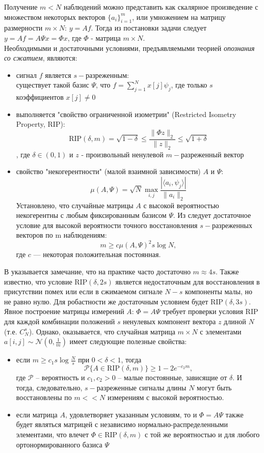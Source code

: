 \documentclass[14pt]{matmex-diploma}
\begin{document}
Получение $m < N$ наблюдений можно представить как скалярное произведение с множеством некоторых векторов $\{a_i\}_{i=1}^m$, или умножением на матрицу размерности $m\times N$: $y= A f$. Тогда из постановки задачи следует $y=A f = A \Psi x = \Phi x$, где $\Phi$ - матрица $m \times N$. \\
Необходимыми и достаточными условиями, предъявляемыми теорией \textit{опознания со сжатием}, являются: 
\begin{itemize}
\item сигнал $f$ является $s-$разреженным: \\существует такой базис $\Psi$, что $f = \sum_{j=1}^N x[j] \psi_j$, где только $s$ коэффициентов $x[j]\neq 0$
\item выполняется "свойство ограниченной изометрии" (Restricted Isometry Property, RIP):
$$\text{RIP}(\delta, m)= \sqrt{1 - \delta} \leq \frac{\| \Phi z \|_2}{\| z\|_2} \leq \sqrt{1 + \delta}$$, где $\delta \in (0,1)$ и $z$ - произвольный ненулевой $m-$разреженный вектор

\item свойство "некогерентности" (малой взаимной зависимости) $A$ и $\Psi$: 
$$\mu (A, \Psi) = \sqrt{N} \max_{i,j}\frac{|\langle a_i, \psi_j\rangle |}{\| a_i\|_2}$$
Установлено, что случайные матрицы $A$ с высокой вероятностью некогерентны с любым фиксированным базисом $\Psi$.
Из \cite{candes2007sparsity} следует достаточное условие для высокой вероятности точного восстановления $s-$разреженных векторов по m наблюдениям: 
\begin{equation}m \geq c \mu (A,\Psi)^2 s \log{N}, \end{equation}
где $c$ --- некоторая положительная постоянная.
\end{itemize}
В \cite{cande2008introduction} указывается замечание, что на практике часто достаточно $m\approx 4s$. Также известно, что условие $\text{RIP}(\delta, 2s)$ является недостаточным для восстановления в присутствии помех или если в сжимаемом сигнале $N - s$ компоненты малы, но не равно нулю. Для робастности же достаточным условием будет $\text{RIP}(\delta, 3s)$. Явное построение матрицы измерений $A$: $\Phi = A\Psi$ требует проверки условия RIP для каждой комбинации положений $s$ ненулевых компонент вектора $z$ длиной $N$ (т.е. $C_N^s$). Однако, оказывается, что случайная матрица $m \times N$ с элементами $a[i, j] \sim \mathcal{N}(0, \frac{1}{m})$ имеет следующие полезные свойства\cite{candes2006robust}:
\begin{itemize}
\item если $m \geq c_1 s \log{\frac{N}{s}}$ при $0 < \delta < 1$, тогда \\ 
$$\mathcal{P}\{A \in \text{RIP}(\delta, m)\} \geq 1 - 2e^{-c_2 m},$$где $\mathcal{P}$ -- вероятность и $c_1,c_2 > 0$  -- малые постоянные, зависящие от $\delta$. И тогда, следовательно, $s-$разреженные сигналы длины $N$ могут быть восстановлены по $m << N$ измерениям с высокой вероятностью. 
\item если матрица $A$, удовлетворяет указанным условиям, то и $\Phi = A\Psi$ также будет являться матрицей с независимо нормально-распределенными элементами, что влечет $\Phi \in \text{RIP}(\delta ,m)$ с той же вероятностью и для любого ортонормированного базиса $\Psi$
\end{itemize}
\end{document}
